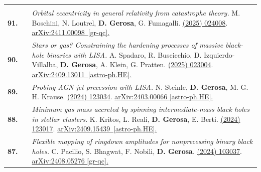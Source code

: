 {\begin{longtable}{rp{0.3cm}p{15.8cm}}
\vspace{0.09cm}\\
%
\textbf{91.} & & \textit{Orbital eccentricity in general relativity from catastrophe theory.}
\newline{}
M. Boschini, N. Loutrel, \textbf{D. Gerosa}, G. Fumagalli.
\newline{}
\href{https://journals.aps.org/prd/abstract/10.1103/PhysRevD.111.024008}{\prd 111 (2025) 024008}. \href{https://arxiv.org/abs/2411.00098}{arXiv:2411.00098 [gr-qc].}
\vspace{0.09cm}\\
%
\textbf{90.} & & \textit{Stars or gas? Constraining the hardening processes of massive black-hole binaries with LISA.}
\newline{}
A. Spadaro, R. Buscicchio, D. Izquierdo-Villalba, \textbf{D. Gerosa}, A. Klein, G. Pratten.
\newline{}
\href{https://journals.aps.org/prd/abstract/10.1103/PhysRevD.111.023004}{\prd 111 (2025) 023004}. \href{https://arxiv.org/abs/2409.13011}{arXiv:2409.13011 [astro-ph.HE].}
\vspace{0.09cm}\\
%
\textbf{89.} & & \textit{Probing AGN jet precession with LISA.}
\newline{}
N. Steinle, \textbf{D. Gerosa}, M. G. H. Krause.
\newline{}
\href{https://journals.aps.org/prd/abstract/10.1103/PhysRevD.110.123034}{\prd 110 (2024) 123034}. \href{https://arxiv.org/abs/2403.00066}{arXiv:2403.00066 [astro-ph.HE].}
\vspace{0.09cm}\\
%
\textbf{88.} & & \textit{Minimum gas mass accreted by spinning intermediate-mass black holes in stellar clusters.}
\newline{}
K. Kritos, L. Reali, \textbf{D. Gerosa}, E. Berti.
\newline{}
\href{https://journals.aps.org/prd/abstract/10.1103/PhysRevD.110.123017}{\prd 110 (2024) 123017}. \href{https://arxiv.org/abs/2409.15439}{arXiv:2409.15439 [astro-ph.HE].}
\vspace{0.09cm}\\
%
\textbf{87.} & & \textit{Flexible mapping of ringdown amplitudes for nonprecessing binary black holes.}
\newline{}
C. Pacilio, S. Bhagwat, F. Nobili, \textbf{D. Gerosa}.
\newline{}
\href{https://journals.aps.org/prd/abstract/10.1103/PhysRevD.110.103037}{\prd 110 (2024) 103037}. \href{https://arxiv.org/abs/2408.05276}{arXiv:2408.05276 [gr-qc].}

\end{longtable}}
